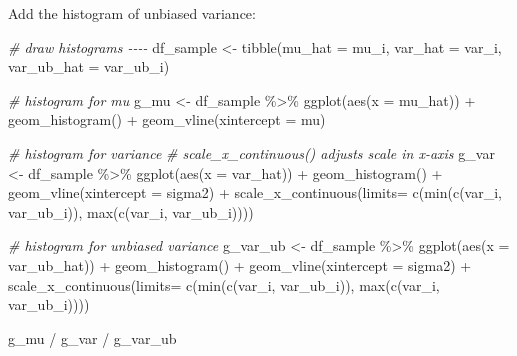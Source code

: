 \documentclass[
]{article}
\newenvironment{Shaded}{\begin{snugshade}}{\end{snugshade}}
\newcommand{\AttributeTok}[1]{\textcolor[rgb]{0.77,0.63,0.00}{#1}}
\newcommand{\CommentTok}[1]{\textcolor[rgb]{0.56,0.35,0.01}{\textit{#1}}}
\newcommand{\FunctionTok}[1]{\textcolor[rgb]{0.00,0.00,0.00}{#1}}
\newcommand{\NormalTok}[1]{#1}
\newcommand{\OtherTok}[1]{\textcolor[rgb]{0.56,0.35,0.01}{#1}}
\newcommand{\SpecialCharTok}[1]{\textcolor[rgb]{0.00,0.00,0.00}{#1}}
\begin{document}
Add the histogram of unbiased variance:

\begin{Shaded}
\begin{Highlighting}[]
\CommentTok{\# draw histograms {-}{-}{-}{-}}
\NormalTok{df\_sample }\OtherTok{\textless{}{-}} \FunctionTok{tibble}\NormalTok{(}\AttributeTok{mu\_hat =}\NormalTok{ mu\_i,}
                    \AttributeTok{var\_hat =}\NormalTok{ var\_i,}
                    \AttributeTok{var\_ub\_hat =}\NormalTok{ var\_ub\_i)}

\CommentTok{\# histogram for mu}
\NormalTok{g\_mu }\OtherTok{\textless{}{-}}\NormalTok{ df\_sample }\SpecialCharTok{\%\textgreater{}\%} 
  \FunctionTok{ggplot}\NormalTok{(}\FunctionTok{aes}\NormalTok{(}\AttributeTok{x =}\NormalTok{ mu\_hat)) }\SpecialCharTok{+}
  \FunctionTok{geom\_histogram}\NormalTok{() }\SpecialCharTok{+}
  \FunctionTok{geom\_vline}\NormalTok{(}\AttributeTok{xintercept =}\NormalTok{ mu)}

\CommentTok{\# histogram for variance}
\CommentTok{\# scale\_x\_continuous() adjusts scale in x{-}axis}
\NormalTok{g\_var }\OtherTok{\textless{}{-}}\NormalTok{ df\_sample }\SpecialCharTok{\%\textgreater{}\%} 
  \FunctionTok{ggplot}\NormalTok{(}\FunctionTok{aes}\NormalTok{(}\AttributeTok{x =}\NormalTok{ var\_hat)) }\SpecialCharTok{+}
  \FunctionTok{geom\_histogram}\NormalTok{() }\SpecialCharTok{+}
  \FunctionTok{geom\_vline}\NormalTok{(}\AttributeTok{xintercept =}\NormalTok{ sigma2) }\SpecialCharTok{+}
  \FunctionTok{scale\_x\_continuous}\NormalTok{(}\AttributeTok{limits=} \FunctionTok{c}\NormalTok{(}\FunctionTok{min}\NormalTok{(}\FunctionTok{c}\NormalTok{(var\_i, var\_ub\_i)),}
                               \FunctionTok{max}\NormalTok{(}\FunctionTok{c}\NormalTok{(var\_i, var\_ub\_i))))}

\CommentTok{\# histogram for unbiased variance}
\NormalTok{g\_var\_ub }\OtherTok{\textless{}{-}}\NormalTok{ df\_sample }\SpecialCharTok{\%\textgreater{}\%} 
  \FunctionTok{ggplot}\NormalTok{(}\FunctionTok{aes}\NormalTok{(}\AttributeTok{x =}\NormalTok{ var\_ub\_hat)) }\SpecialCharTok{+}
  \FunctionTok{geom\_histogram}\NormalTok{() }\SpecialCharTok{+}
  \FunctionTok{geom\_vline}\NormalTok{(}\AttributeTok{xintercept =}\NormalTok{ sigma2) }\SpecialCharTok{+}
  \FunctionTok{scale\_x\_continuous}\NormalTok{(}\AttributeTok{limits=} \FunctionTok{c}\NormalTok{(}\FunctionTok{min}\NormalTok{(}\FunctionTok{c}\NormalTok{(var\_i, var\_ub\_i)),}
                               \FunctionTok{max}\NormalTok{(}\FunctionTok{c}\NormalTok{(var\_i, var\_ub\_i))))}

\NormalTok{g\_mu }\SpecialCharTok{/}\NormalTok{ g\_var }\SpecialCharTok{/}\NormalTok{ g\_var\_ub}
\end{Highlighting}
\end{Shaded}
\end{document}
